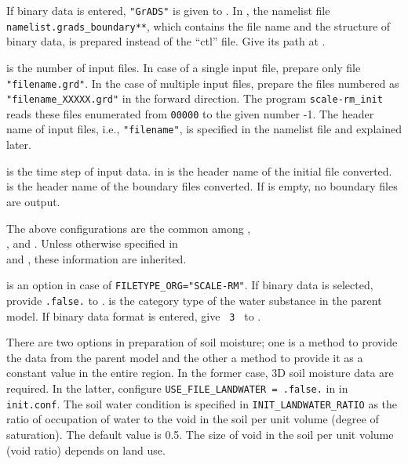 If binary data is entered, \verb|"GrADS"| is given to .
In \scalerm, the namelist file \verb|namelist.grads_boundary**|, which contains the file name and the structure of binary data, is prepared instead of the ``ctl'' file. Give its path at .

 is the number of input files.
In case of a single input file, prepare only file \verb|"filename.grd"|.
In the case of multiple input files, prepare the files numbered as \verb|"filename_XXXXX.grd"| in the forward direction.
The program \verb|scale-rm_init| reads these files enumerated from \verb|00000| to the given number -1.
The header name of input files, i.e., \verb|"filename"|, is specified in the namelist file and explained later.

 is the time step of input data.
 in  is the header name of the initial file converted.
 is the header name of the boundary files converted.
If  is empty, no boundary files are output.

The above configurations are the common among ,\\ , and . Unless otherwise specified in\\
 and , these information are inherited.

 is an option in case of \verb|FILETYPE_ORG="SCALE-RM"|.
If binary data is selected, provide \verb|.false.| to .
 is the category type of the water substance in the parent model.
If binary data format is entered, give \verb| 3 | to .

There are two options in preparation of soil moisture; one is a method to provide the data from the parent model and the other a method to provide it as a constant value in the entire region.
In the former case, 3D soil moisture data are required. In the latter, configure \verb|USE_FILE_LANDWATER = .false.| in  in \verb|init.conf|.
The soil water condition is specified in \verb|INIT_LANDWATER_RATIO| as the ratio of occupation of water to the void in the soil per unit volume (degree of saturation). The default value is 0.5. The size of void in the soil per unit volume (void ratio) depends on land use.

